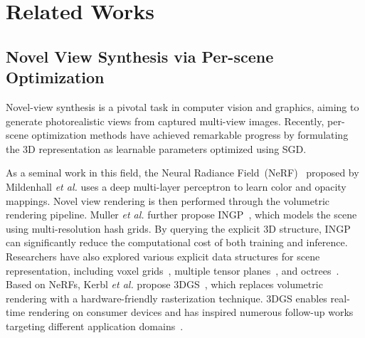 \documentclass[lettersize,journal]{IEEEtran}
\begin{document}
\section{Related Works}
\label{sec:related works}
\subsection{Novel View Synthesis via Per-scene Optimization}
Novel-view synthesis is a pivotal task in computer vision and graphics, aiming to generate photorealistic views from captured multi-view images.
Recently, per-scene optimization methods have achieved remarkable progress by formulating the 3D representation as learnable parameters optimized using SGD.

As a seminal work in this field, the Neural Radiance Field~(NeRF)~\cite{mildenhall2021nerf} proposed by Mildenhall \textit{et al.} uses a deep multi-layer perceptron to learn color and opacity mappings. Novel view rendering is then performed through the volumetric rendering pipeline.
Muller \textit{et al.} further propose INGP~\cite{muller2022instant}, which models the scene using multi-resolution hash grids. By querying the explicit 3D structure, INGP can significantly reduce the computational cost of both training and inference.
Researchers have also explored various explicit data structures for scene representation, including voxel grids~\cite{sun2022direct, fridovich2022plenoxels}, multiple tensor planes~\cite{fridovich2023k, chen2022tensorf}, and octrees~\cite{yu2021plenoctrees}.
Based on NeRFs, Kerbl \textit{et al.} propose 3DGS~\cite{3dgs_vanilla}, which replaces volumetric rendering with a hardware-friendly rasterization technique. 3DGS enables real-time rendering on consumer devices and has inspired numerous follow-up works targeting different application domains~\cite{fu2024colmap, qian20243dgs, meng2024mirror, yu2024mip}. 
\end{document}
